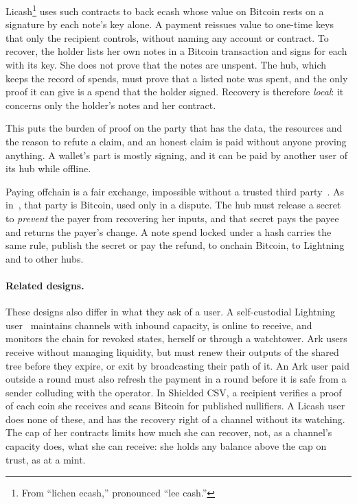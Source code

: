 \documentclass[11pt]{article}
\begin{document}
Licash\footnote{From ``lichen ecash,'' pronounced ``lee cash.''} uses such contracts to back ecash whose value on Bitcoin rests on a signature by each note's key alone. A payment reissues value to one-time keys that only the recipient controls, without naming any account or contract. To recover, the holder lists her own notes in a Bitcoin transaction and signs for each with its key. She does not prove that the notes are unspent. The hub, which keeps the record of spends, must prove that a listed note was spent, and the only proof it can give is a spend that the holder signed. Recovery is therefore \emph{local}: it concerns only the holder's notes and her contract.

This puts the burden of proof on the party that has the data, the resources and the reason to refute a claim, and an honest claim is paid without anyone proving anything. A wallet's part is mostly signing, and it can be paid by another user of its hub while offline.

Paying offchain is a fair exchange, impossible without a trusted third party~\cite{fairexchange}. As in~\cite{andrychowicz,bentov}, that party is Bitcoin, used only in a dispute. The hub must release a secret to \emph{prevent} the payer from recovering her inputs, and that secret pays the payee and returns the payer's change. A note spend locked under a hash carries the same rule, publish the secret or pay the refund, to onchain Bitcoin, to Lightning and to other hubs.

\paragraph{Related designs.} These designs also differ in what they ask of a user. A self-custodial Lightning user~\cite{lightning} maintains channels with inbound capacity, is online to receive, and monitors the chain for revoked states, herself or through a watchtower. Ark users receive without managing liquidity, but must renew their outputs of the shared tree before they expire, or exit by broadcasting their path of it. An Ark user paid outside a round must also refresh the payment in a round before it is safe from a sender colluding with the operator. In Shielded CSV, a recipient verifies a proof of each coin she receives and scans Bitcoin for published nullifiers. A Licash user does none of these, and has the recovery right of a channel without its watching. The cap of her contracts limits how much she can recover, not, as a channel's capacity does, what she can receive: she holds any balance above the cap on trust, as at a mint.
\end{document}
